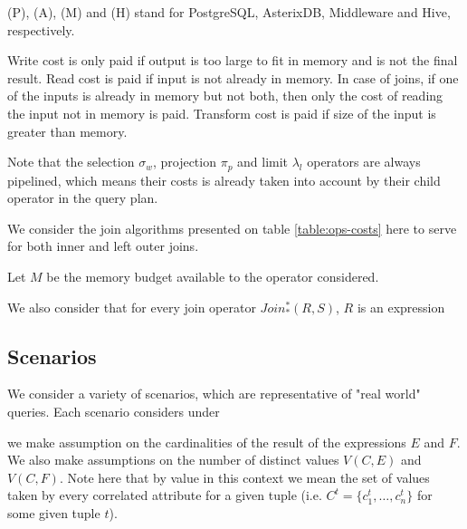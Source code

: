 (P), (A), (M) and (H) stand for PostgreSQL, AsterixDB, Middleware and Hive, respectively.

Write cost is only paid if output is too large to fit in memory and is not the final result. Read cost is paid if input is not already in memory. In case of joins, if one of the inputs is already in memory but not both, then only the cost of reading the input not in memory is paid. Transform cost is paid if size of the input is greater than memory.

Note that the selection $\sigma_w$, projection $\pi_p$ and limit $\lambda_l$ operators are always pipelined, which means their costs is already taken into account by their child operator in the query plan.

We consider the join algorithms presented on table \ref{table:ops-costs} here to serve for both inner and left outer joins. 

Let $M$ be the memory budget available to the operator considered. 

We also consider that for every join operator $Join_*^*(R,S)$, $R$ is an expression 


\subsection{Scenarios}

We consider a variety of scenarios, which are representative of "real world" queries. Each scenario considers under 

we make assumption on the cardinalities of the result of the expressions $E$ and $F$. We also make assumptions on the number of distinct values $V(C,E)$ and $V(C,F)$. Note here that by value in this context we mean the set of values taken by every correlated attribute for a given tuple (i.e. $C^t = \{c_1^t, \dots, c_n^t\}$ for some given tuple $t$).






